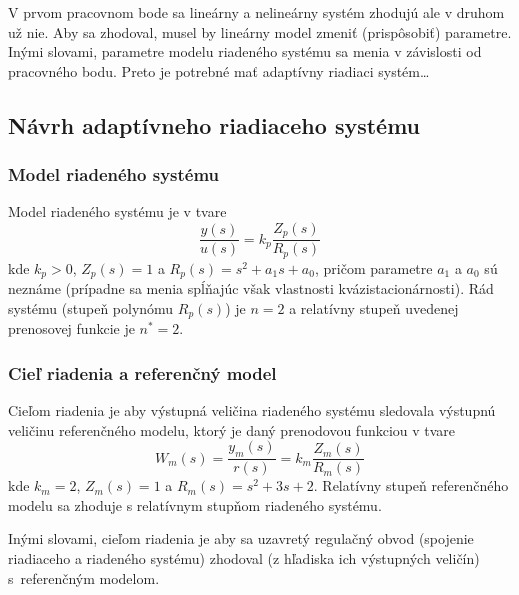 \documentclass[a4paper, 10pt, ]{article}
\begin{document}
V prvom pracovnom bode sa lineárny a nelineárny systém zhodujú ale v druhom už nie. Aby sa zhodoval, musel by lineárny model zmeniť (prispôsobiť) parametre.  Inými slovami, parametre modelu riadeného systému sa menia v závislosti od pracovného bodu. Preto je potrebné mať adaptívny riadiaci systém\ldots













\subsection{Návrh adaptívneho riadiaceho systému}


\subsubsection{Model riadeného systému}

Model riadeného systému je v tvare
\begin{equation}
       \frac{y(s)}{u(s)} = k_p \frac{Z_p(s)}{R_p(s)}
\end{equation}
kde $k_p > 0$, $Z_p(s) = 1$ a $R_p(s) = s^2 + a_1s + a_0$, pričom parametre $a_1$ a $a_0$ sú neznáme (prípadne sa menia spĺňajúc však vlastnosti kvázistacionárnosti). Rád systému (stupeň polynómu $R_p(s)$) je $n = 2$ a relatívny stupeň uvedenej prenosovej funkcie je $n^* = 2$.




\subsubsection{Cieľ riadenia a referenčný model}

Cieľom riadenia je aby výstupná veličina riadeného systému sledovala výstupnú veličinu referenčného modelu, ktorý je daný prenodovou funkciou v tvare
\begin{equation}
       W_m(s) = \frac{y_m(s)}{r(s)} = k_m \frac{Z_m(s)}{R_m(s)}
\end{equation}
kde $k_m = 2$, $Z_m(s) = 1$ a $R_m(s) = s^2 + 3s + 2$. Relatívny stupeň referenčného modelu sa zhoduje s relatívnym stupňom riadeného systému.

Inými slovami, cieľom riadenia je aby sa uzavretý regulačný obvod (spojenie riadiaceho a riadeného systému) zhodoval (z hľadiska ich výstupných veličín) s~referenčným modelom.
\end{document}
